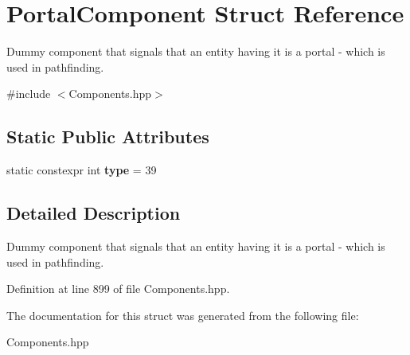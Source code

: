 \hypertarget{struct_portal_component}{}\section{Portal\+Component Struct Reference}
\label{struct_portal_component}


Dummy component that signals that an entity having it is a portal -\/ which is used in pathfinding.  




{\ttfamily \#include $<$Components.\+hpp$>$}

\subsection*{Static Public Attributes}
\begin{DoxyCompactItemize}
\item 
static constexpr int {\bfseries type} = 39\hypertarget{struct_portal_component_afdcd2a4887aef400c454143f1c384e7d}{}\label{struct_portal_component_afdcd2a4887aef400c454143f1c384e7d}

\end{DoxyCompactItemize}


\subsection{Detailed Description}
Dummy component that signals that an entity having it is a portal -\/ which is used in pathfinding. 

Definition at line 899 of file Components.\+hpp.



The documentation for this struct was generated from the following file\+:\begin{DoxyCompactItemize}
\item 
Components.\+hpp\end{DoxyCompactItemize}
